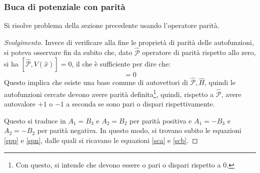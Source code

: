 \documentclass[10pt, a4paper]{scrartcl} %
\numberwithin{equation}{subsection}
\theoremstyle{style2}
\theoremstyle{style1}
\renewcommand\qedsymbol{$\blacksquare$}
\newenvironment{svolgimento}{\renewcommand\qedsymbol{$\spadesuit$}\begin{proof}[Svolgimento]}{\end{proof}}
\begin{document}
\subsubsection{Buca di potenziale con parit\`a}
Si risolve problema della sezione precedente usando l'operatore parit\`a.
\begin{svolgimento}
	Invece di verificare alla fine le propriet\`a di parit\`a delle autofunzioni, si poteva osservare fin da subito che, dato $\hat{\mathcal{P}}$ operatore di parit\`a rispetto allo zero, si ha $[\hat{\mathcal{P}},V(\hat{x})]= 0$, il che \`e sufficiente per dire che:
	\begin{equation}
		[\hat{\mathcal{P}}, \hat{H}] =0
	\end{equation}
Questo implica che esiste una base comune di autovettori di $\hat{\mathcal{P}}, \hat{H}$, 
quindi le autofunzioni cercate devono avere parit\`a definita\footnote{Con questo, si intende che devono essere o pari o dispari rispetto a $0$.}, quindi, rispetto a $\hat{\mathcal{P}}$, avere autovalore $+1$ o $-1 $ a seconda se sono pari o dispari rispettivamente.

Questo si traduce in $A_1 = B_3$ e $A_2=B_2$ per parit\`a positiva e $A_1= - B_3$ e $A_2=-B_2$ per parit\`a negativa.
In questo modo, si trovano subito le equazioni \ref{spp} e \ref{spn}, dalle quali si ricavano le equazioni \ref{sca} e \ref{scb}.
\end{svolgimento}
\end{document}
